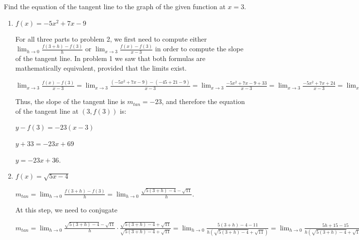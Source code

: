 \documentclass[handout,nooutcomes]{ximera}
\begin{document}
	
	
\newpage
			
			

\begin{problem}
Find the equation of the tangent line to the graph of the given function at $x=3$.

	\begin{enumerate}
	
	\item  $f(x) = -5x^2 + 7x - 9$
		\begin{freeResponse}
		For all three parts to problem 2, we first need to compute either $\lim_{h \to 0} \frac{f(3+h) - f(3)}{h}$ or $\lim_{x \to 3} \frac{f(x) - f(3)}{x-3}$ in order to compute the slope of the tangent line.  In problem 1 we saw that both formulas are mathematically equivalent, provided that the limits exist.  
		
		$\lim_{x \to 3} \frac{f(x) - f(3)}{x-3}
		= \lim_{x \to 3} \frac{(-5x^2 + 7x - 9) - (-45 + 21 - 9)}{x-3}
		= \lim_{x \to 3} \frac{-5x^2 + 7x - 9 + 33}{x-3}
		= \lim_{x \to 3} \frac{-5x^2 + 7x + 24}{x-3}
		= \lim_{x \to 3} \frac{(x-3)(-5x -8)}{x-3}
		= \lim_{x \to 3} (-5x - 8)
		= -5(3) - 8
		= -23.$
		
		Thus, the slope of the tangent line is $m_{tan}=-23$, and therefore the equation of the tangent line at $(3, f(3))$ is:
		
		$y - f(3) = -23(x-3)$
		
		$y + 33 = -23x + 69$
		
		$y = -23x + 36.$
		\end{freeResponse}
		
		
		
	
	\item  $f(x) = \sqrt{5x-4}$
		\begin{freeResponse}
		$m_{tan} = \lim_{h \to 0} \frac{f(3+h) - f(3)}{h}
		= \lim_{h \to 0} \frac{\sqrt{5(3+h) - 4} - \sqrt{11}}{h}.$
		
		At this step, we need to conjugate
		
		$m_{tan} = \lim_{h \to 0} \frac{\sqrt{5(3+h) - 4} - \sqrt{11}}{h} \cdot \frac{\sqrt{5(3+h) - 4} + \sqrt{11}}{\sqrt{5(3+h) - 4} + \sqrt{11}} 
		= \lim_{h \to 0} \frac{5(3+h) - 4 - 11}{h \left( \sqrt{5(3+h) - 4} + \sqrt{11} \right) }
		= \lim_{h \to 0} \frac{5h + 15 - 15}{h \left( \sqrt{5(3+h) - 4} + \sqrt{11} \right) }
		= \lim_{h \to 0} \frac{5}{\left( \sqrt{5(3+h) - 4} + \sqrt{11} \right) }
		= \frac{5}{\sqrt{5(3+0) - 4} + \sqrt{11}}
		= \frac{5}{2 \sqrt{11}}.$
		

\end{freeResponse}
\end{enumerate}
\end{problem}
\end{document}
